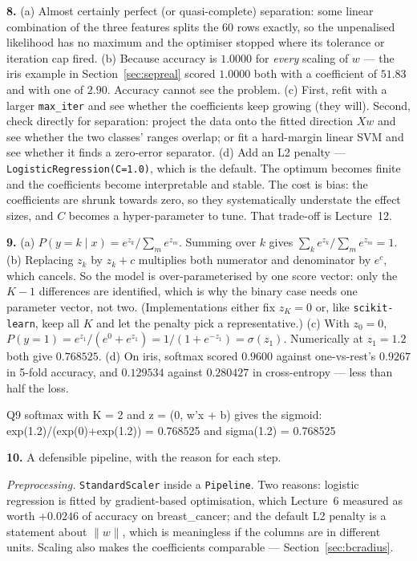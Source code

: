 \documentclass[11pt]{article}
\begin{document}
\medskip
\textbf{8.} (a) Almost certainly perfect (or quasi-complete) separation: some
linear combination of the three features splits the $60$ rows exactly, so the
unpenalised likelihood has no maximum and the optimiser stopped where its
tolerance or iteration cap fired.
(b) Because accuracy is $1.0000$ for \emph{every} scaling of $w$ --- the iris
example in Section~\ref{sec:sepreal} scored $1.0000$ both with a coefficient
of $51.83$ and with one of $2.90$. Accuracy cannot see the problem.
(c) First, refit with a larger \texttt{max\_iter} and see whether the
coefficients keep growing (they will). Second, check directly for separation:
project the data onto the fitted direction $Xw$ and see whether the two
classes' ranges overlap; or fit a hard-margin linear SVM and see whether it
finds a zero-error separator.
(d) Add an L2 penalty --- \texttt{LogisticRegression(C=1.0)}, which is the
default. The optimum becomes finite and the coefficients become interpretable
and stable. The cost is bias: the coefficients are shrunk towards zero, so
they systematically understate the effect sizes, and $C$ becomes a
hyper-parameter to tune. That trade-off is Lecture~12.

\medskip
\textbf{9.} (a) $P(y=k\mid x) = e^{z_k}/\sum_m e^{z_m}$. Summing over $k$
gives $\sum_k e^{z_k}/\sum_m e^{z_m} = 1$.
(b) Replacing $z_k$ by $z_k + c$ multiplies both numerator and denominator by
$e^{c}$, which cancels. So the model is over-parameterised by one score
vector: only the $K-1$ differences are identified, which is why the binary
case needs one parameter vector, not two. (Implementations either fix
$z_K = 0$ or, like \texttt{scikit-learn}, keep all $K$ and let the penalty
pick a representative.)
(c) With $z_0 = 0$, $P(y=1) = e^{z_1}/(e^{0}+e^{z_1}) = 1/(1+e^{-z_1})
= \sigma(z_1)$. Numerically at $z_1 = 1.2$ both give $0.768525$.
(d) On iris, softmax scored $0.9600$ against one-vs-rest's $0.9267$ in 5-fold
accuracy, and $0.129534$ against $0.280427$ in cross-entropy --- less than
half the loss.

\begin{codeout}
Q9  softmax with K = 2 and z = (0, w'x + b) gives the sigmoid:
    exp(1.2)/(exp(0)+exp(1.2)) = 0.768525  and sigma(1.2) = 0.768525
\end{codeout}

\medskip
\textbf{10.} A defensible pipeline, with the reason for each step.

\emph{Preprocessing.} \texttt{StandardScaler} inside a \texttt{Pipeline}. Two
reasons: logistic regression is fitted by gradient-based optimisation, which
Lecture~6 measured as worth $+0.0246$ of accuracy on breast\_cancer; and the
default L2 penalty is a statement about $\lVert w\rVert$, which is
meaningless if the columns are in different units. Scaling also makes the
coefficients comparable --- Section~\ref{sec:bcradius}.
\end{document}
